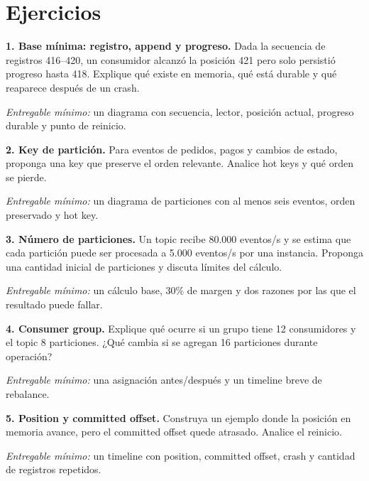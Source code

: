 \documentclass[variant=guia,cover=institutional,mode=screen]{ua-engineering-v6-article}
\begin{document}
\section{Ejercicios}
\begin{uaexercise}

\textbf{1. Base mínima: registro, append y progreso.} Dada la secuencia de registros 416--420, un consumidor alcanzó la posición 421 pero solo persistió progreso hasta 418. Explique qué existe en memoria, qué está durable y qué reaparece después de un crash.

\textit{Entregable mínimo:} un diagrama con secuencia, lector, posición actual, progreso durable y punto de reinicio.
\end{uaexercise}
\begin{uaexercise}

\textbf{2. Key de partición.} Para eventos de pedidos, pagos y cambios de estado, proponga una key que preserve el orden relevante. Analice hot keys y qué orden se pierde.

\textit{Entregable mínimo:} un diagrama de particiones con al menos seis eventos, orden preservado y hot key.
\end{uaexercise}
\begin{uaexercise}

\textbf{3. Número de particiones.} Un topic recibe 80.000 eventos/s y se estima que cada partición puede ser procesada a 5.000 eventos/s por una instancia. Proponga una cantidad inicial de particiones y discuta límites del cálculo.

\textit{Entregable mínimo:} un cálculo base, 30\% de margen y dos razones por las que el resultado puede fallar.
\end{uaexercise}
\begin{uaexercise}

\textbf{4. Consumer group.} Explique qué ocurre si un grupo tiene 12 consumidores y el topic 8 particiones. ¿Qué cambia si se agregan 16 particiones durante operación?

\textit{Entregable mínimo:} una asignación antes/después y un timeline breve de rebalance.
\end{uaexercise}
\begin{uaexercise}

\textbf{5. Position y committed offset.} Construya un ejemplo donde la posición en memoria avance, pero el committed offset quede atrasado. Analice el reinicio.

\textit{Entregable mínimo:} un timeline con position, committed offset, crash y cantidad de registros repetidos.
\end{uaexercise}
\end{document}
